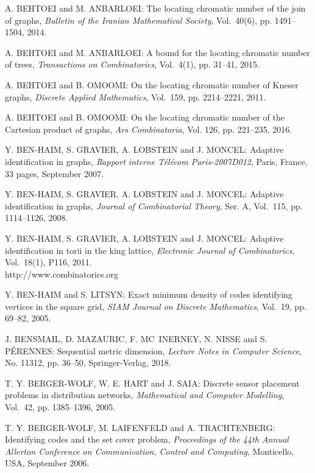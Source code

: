 \begin{thebibliography}{999}
A. BEHTOEI and M. ANBARLOEI: The locating chromatic number of the join of graphs, {\it Bulletin of the Iranian Mathematical Society}, Vol.~40(6), pp. 1491--1504, 2014.

A. BEHTOEI and M. ANBARLOEI: A bound for the locating chromatic number of trees, {\it Transactions on Combinatorics}, Vol.~4(1), pp. 31--41, 2015.

A. BEHTOEI and B. OMOOMI: On the locating chromatic number of Kneser graphs, {\it Discrete Applied Mathematics}, Vol.~159, pp. 2214--2221, 2011.

A. BEHTOEI and B. OMOOMI: On the locating chromatic number of the Cartesian product of graphs, {\it Ars Combinatoria}, Vol. 126, pp. 221--235, 2016.

Y. BEN-HAIM, S. GRAVIER, A. LOBSTEIN and J. MONCEL: Adaptive identification in graphs, {\it Rapport interne T\'el\'ecom Paris-2007D012}, Paris, France, 33 pages, September 2007.

Y. BEN-HAIM, S. GRAVIER, A. LOBSTEIN and J. MONCEL: Adaptive identification in graphs, {\it Journal of Combinatorial Theory}, Ser. A, Vol.~115, pp. 1114--1126, 2008.

Y. BEN-HAIM, S. GRAVIER, A. LOBSTEIN and J. MONCEL: Adaptive identification in torii in the king lattice, {\it Electronic Journal of Combinatorics}, Vol.~18(1), P116, 2011.\\
http://www.combinatorics.org

Y. BEN-HAIM and S. LITSYN: Exact minimum density of codes identifying vertices in the square grid, {\it SIAM Journal on Discrete Mathematics}, Vol.~19, pp. 69--82, 2005.

J. BENSMAIL, D. MAZAURIC, F. MC~INERNEY, N. NISSE and S. P\'E\-RENNES: Sequential metric dimension, {\it Lecture Notes in Computer Science}, No. 11312, pp. 36--50, Springer-Verlag, 2018.

T. Y. BERGER-WOLF, W. E. HART and J. SAIA: Discrete sensor placement problems in distribution networks, {\it Mathematical and Computer Modelling}, Vol.~42, pp. 1385--1396, 2005.

T. Y. BERGER-WOLF, M. LAIFENFELD and A. TRACHTENBERG: Identifying codes and the set cover problem, {\it Proceedings of the 44th Annual Allerton Conference on Communication, Control and Computing}, Monticello, USA, September 2006.


\end{thebibliography}

